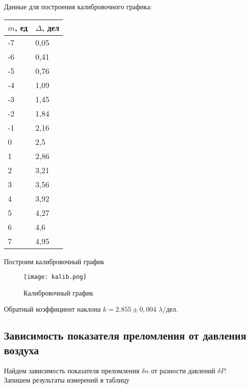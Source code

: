 Данные для построения калибровочного графика:
\begin{table}[H]
	\centering
	\begin{tabular}{|l|l|}
		\hline
		$m$, ед & $\Delta$, дел \\ \hline
		-7      & 0,05          \\ \hline
		-6      & 0,41          \\ \hline
		-5      & 0,76          \\ \hline
		-4      & 1,09          \\ \hline
		-3      & 1,45          \\ \hline
		-2      & 1,84          \\ \hline
		-1      & 2,16          \\ \hline
		0       & 2,5           \\ \hline
		1       & 2,86          \\ \hline
		2       & 3,21          \\ \hline
		3       & 3,56          \\ \hline
		4       & 3,92          \\ \hline
		5       & 4,27          \\ \hline
		6       & 4,6           \\ \hline
		7       & 4,95          \\ \hline
	\end{tabular}
\end{table}

Построим калибровочный график
\begin{figure}[H]
	\centering
	\texttt{[image: kalib.png]}
	\caption{Калибровочный график}
\end{figure}

Обратный коэффициент наклона $k = 2.855 \pm 0,004$ $\lambda$/дел.

\subsection{Зависимость показателя преломления от давления воздуха}

Найдем зависимость показателя преломления $\delta n$ от разности давлений $\delta P$. Запишем результаты измерений в таблицу

